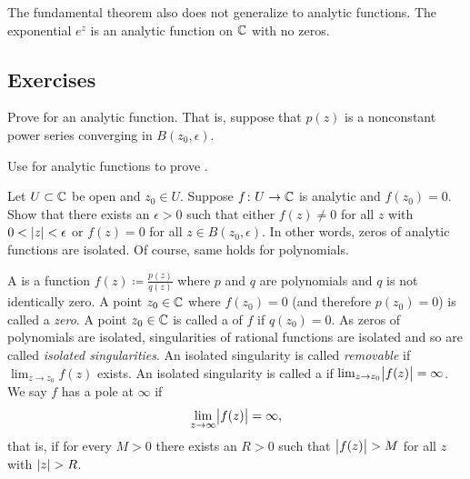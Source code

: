The fundamental theorem also does not generalize to analytic functions.  The
exponential $e^{z}$ is an analytic function on ${\mathbb{C}}$ with no zeros.

\subsection{Exercises}

\begin{exercise} \label{exercise:minprinciple}
Prove  for an analytic function.  That
is, suppose that $p(z)$ is a nonconstant power series converging in
$B(z_0,\epsilon)$.
\end{exercise}

\begin{exercise} \label{exercise:maxprinciple}
Use  for analytic functions to prove .
\end{exercise}

\begin{exercise}
Let $U \subset {\mathbb{C}}$ be open and $z_0 \in U$.
Suppose $f \colon U \to {\mathbb{C}}$ is analytic and $f(z_0) = 0$.  Show that
there exists an $\epsilon > 0$ such that either
$f(z) \neq 0$ for all $z$ with $0 < \lvert {z} \rvert < \epsilon$
or $f(z) = 0$ for all $z \in B(z_0,\epsilon)$.
In other words, zeros of analytic functions are isolated.
Of course, same holds for polynomials.
\end{exercise}

\begin{exnote}
\pagebreak[1]
A \emph{} is a function
$f(z) \coloneqq \frac{p(z)}{q(z)}$
where $p$ and $q$ are polynomials and $q$ is not identically zero.
A point $z_0 \in {\mathbb{C}}$ where $f(z_0) = 0$ (and therefore $p(z_0) = 0$)
is called a \emph{zero}.
A point $z_0 \in {\mathbb{C}}$ is called a \emph{} of
$f$ if $q(z_0) = 0$.  As zeros of polynomials are isolated,
singularities of rational functions are isolated
and so are called
\emph{isolated singularities}.
An isolated singularity is called
\emph{removable}
if $\lim_{z \to z_0} f(z)$ exists.
An isolated singularity is called a \emph{} if 
$\lim_{z \to z_0} \bigl\lvert {f(z)} \bigr\rvert = \infty$.
We say $f$ has a pole at $\infty$ if
\begin{equation*}
\lim_{z \to \infty} \bigl\lvert {f(z)} \bigr\rvert = \infty ,
\end{equation*}
that is, if for every $M > 0$ there exists an $R > 0$ such that
$\bigl\lvert {f(z)} \bigr\rvert > M$ for all $z$ with $\lvert {z} \rvert > R$.
\end{exnote}

